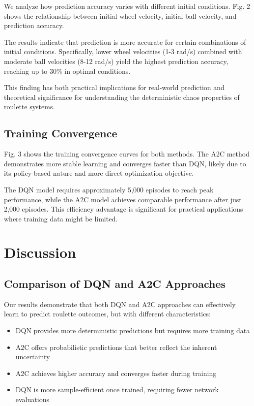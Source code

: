 \documentclass[conference]{IEEEtran}
\begin{document}
We analyze how prediction accuracy varies with different initial conditions. Fig. 2 shows the relationship between initial wheel velocity, initial ball velocity, and prediction accuracy.

The results indicate that prediction is more accurate for certain combinations of initial conditions. Specifically, lower wheel velocities (1-3 rad/s) combined with moderate ball velocities (8-12 rad/s) yield the highest prediction accuracy, reaching up to 30\% in optimal conditions.

This finding has both practical implications for real-world prediction and theoretical significance for understanding the deterministic chaos properties of roulette systems.

\subsection{Training Convergence}

Fig. 3 shows the training convergence curves for both methods. The A2C method demonstrates more stable learning and converges faster than DQN, likely due to its policy-based nature and more direct optimization objective.

The DQN model requires approximately 5,000 episodes to reach peak performance, while the A2C model achieves comparable performance after just 2,000 episodes. This efficiency advantage is significant for practical applications where training data might be limited.

\section{Discussion}

\subsection{Comparison of DQN and A2C Approaches}

Our results demonstrate that both DQN and A2C approaches can effectively learn to predict roulette outcomes, but with different characteristics:

\begin{itemize}
    \item DQN provides more deterministic predictions but requires more training data
    \item A2C offers probabilistic predictions that better reflect the inherent uncertainty
    \item A2C achieves higher accuracy and converges faster during training
    \item DQN is more sample-efficient once trained, requiring fewer network evaluations
\end{itemize}
\end{document}
